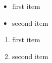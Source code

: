 \documentclass{article}
\begin{document}
\begin{itemize}
  \item first item
  \item second item
\end{itemize}
\begin{enumerate}
  \item first item
  \item second item
\end{enumerate}
\end{document}
